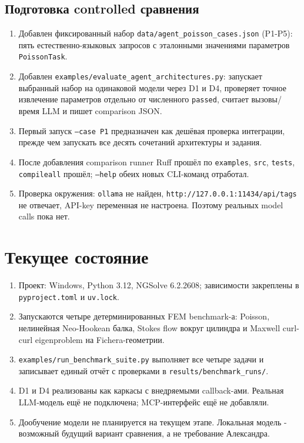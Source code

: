 \documentclass[11pt,a4paper]{article}
\begin{document}
\subsection{Подготовка controlled сравнения}

\begin{enumerate}
    \item Добавлен фиксированный набор \texttt{data/agent\_poisson\_cases.json} (P1-P5): пять естественно-языковых запросов с эталонными значениями параметров \texttt{PoissonTask}.
    \item Добавлен \texttt{examples/evaluate\_agent\_architectures.py}: запускает выбранный набор на одинаковой модели через D1 и D4, проверяет точное извлечение параметров отдельно от численного \texttt{passed}, считает вызовы/время LLM и пишет comparison JSON.
    \item Первый запуск \texttt{--case P1} предназначен как дешёвая проверка интеграции, прежде чем запускать все десять сочетаний архитектуры и задания.
    \item После добавления comparison runner Ruff прошёл по \texttt{examples}, \texttt{src}, \texttt{tests}, \texttt{compileall} прошёл; \texttt{--help} обеих новых CLI-команд отработал.
    \item Проверка окружения: \texttt{ollama} не найден, \texttt{http://127.0.0.1:11434/api/tags} не отвечает, API-key переменная не настроена. Поэтому реальных model calls пока нет.
\end{enumerate}

\section{Текущее состояние}

\begin{enumerate}
    \item Проект: Windows, Python 3.12, NGSolve 6.2.2608; зависимости закреплены в \texttt{pyproject.toml} и \texttt{uv.lock}.
    \item Запускаются четыре детерминированных FEM benchmark-а: Poisson, нелинейная Neo-Hookean балка, Stokes flow вокруг цилиндра и Maxwell curl-curl eigenproblem на Fichera-геометрии.
    \item \texttt{examples/run\_benchmark\_suite.py} выполняет все четыре задачи и записывает единый отчёт с проверками в \texttt{results/benchmark\_runs/}.
    \item D1 и D4 реализованы как каркасы с внедряемыми callback-ами. Реальная LLM-модель ещё не подключена; MCP-интерфейс ещё не добавляли.
    \item Дообучение модели не планируется на текущем этапе. Локальная модель - возможный будущий вариант сравнения, а не требование Александра.
\end{enumerate}
\end{document}
